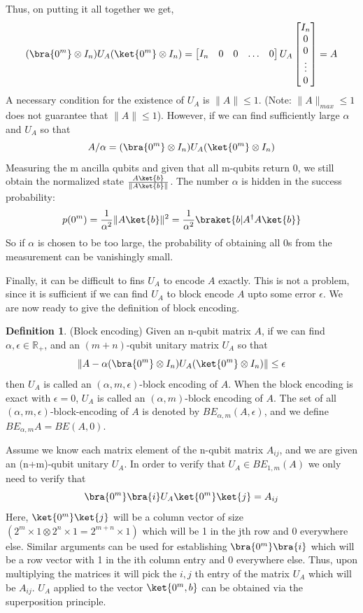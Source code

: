 \documentclass[12pt, oneside]{book}
\theoremstyle{definition}
\newtheorem{definition}{Definition}[section]
\theoremstyle{definition}
\theoremstyle{remark}
\begin{document}
Thus, on putting it all together we get,
\[
(\bra{0^m}\otimes I_n)U_A(\ket{0^m}\otimes I_n)=\begin{bmatrix} I_n & 0 & 0 & \ldots & 0 \end{bmatrix}U_A\begin{bmatrix} I_n \\ 0 \\ 0 \\ \vdots \\ 0 \end{bmatrix}=A
\]
A necessary condition for the existence of $U_A$ is $\|A\| \leq 1$. (Note: $\|A\|_{max}\leq 1$ does not guarantee that $\|A\|\leq 1$). However, if we can find sufficiently large $\alpha$ and $U_A$ so that
\[
A/\alpha = (\bra{0^m}\otimes I_n)U_A(\ket{0^m}\otimes I_n)
\]
Measuring the m ancilla qubits and given that all m-qubits return 0, we still obtain the normalized state $\frac{A\ket{b}}{\|A\ket{b}\|}$.
The number $\alpha$ is hidden in the success probability:
\[
p(0^m)=\frac{1}{\alpha^2}\|A\ket{b}\|^2=\frac{1}{\alpha^2}\braket{b|A^{\dagger}A\ket{b}}
\]
So if $\alpha$ is chosen to be too large, the probability of obtaining all $0$s from the measurement can be vanishingly small.

Finally, it can be difficult to fins $U_A$ to encode $A$ exactly. This is not a problem, since it is sufficient if we can find $U_A$ to block encode $A$ upto some error $\epsilon$. We are now ready to give the definition of block encoding.

\begin{definition}
    (Block encoding) Given an n-qubit matrix $A$, if we can find $\alpha,\epsilon \in \mathbb{R}_+$, and an $(m+n)$-qubit unitary matrix $U_A$ so that
    \[
    \|A-\alpha(\bra{0^m}\otimes I_n)U_A(\ket{0^m}\otimes I_n)\|\leq \epsilon
    \]
    then $U_A$ is called an $(\alpha,m,\epsilon)$-block encoding of $A$. When the block encoding is exact with $\epsilon=0$, $U_A$ is called an $(\alpha,m)$-block encoding of $A$. The set of all $(\alpha,m,\epsilon)$-block-encoding of $A$ is denoted by $BE_{\alpha,m}(A,\epsilon)$, and we define $BE_{\alpha,m}A=BE(A,0)$.
\end{definition}

Assume we know each matrix element of the n-qubit matrix $A_{ij}$, and we are given an (n+m)-qubit unitary $U_A$. In order to verify that $U_A \in BE_{1,m}(A)$ we only need to verify that
\[
\bra{0^m}\bra{i}U_A\ket{0^m}\ket{j}=A_{ij}
\]
Here, $\ket{0^m}\ket{j}$ will be a column vector of size $(2^m \times 1 \otimes  2^n \times 1= 2^{m+n} \times 1)$ which will be 1 in the jth row and 0 everywhere else. Similar arguments can be used for establishing $\bra{0^m}\bra{i}$ which will be a row vector with 1 in the ith column entry and 0 everywhere else. Thus, upon multiplying the matrices it will pick the $i,j$ th entry of the matrix $U_A$ which will be $A_{ij}$. $U_A$ applied to the vector $\ket{0^m,b}$ can be obtained via the superposition principle.
\end{document}
